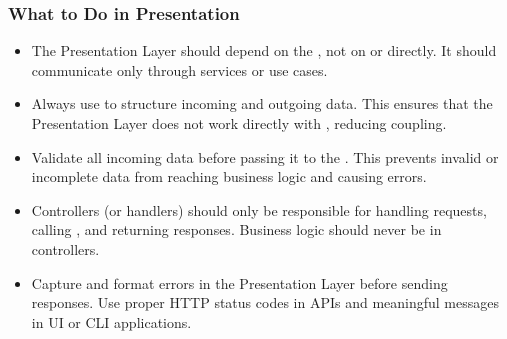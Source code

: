 \documentclass[letterpaper,10pt,english]{sphinxhowto}
\begin{document}
\subsubsection{What to Do in Presentation}
\label{\detokenize{architecture/presentation/index:what-to-do-in-presentation}}\begin{itemize}
\item {} \begin{description}
\sphinxAtStartPar
The Presentation Layer should depend on the , not on  or  directly. It should communicate only through services or use cases.

\end{description}

\item {} \begin{description}
\sphinxAtStartPar
Always use  to structure incoming and outgoing data. This ensures that the Presentation Layer does not work directly with , reducing coupling.

\end{description}

\item {} \begin{description}
\sphinxAtStartPar
Validate all incoming data before passing it to the . This prevents invalid or incomplete data from reaching business logic and causing errors.

\end{description}

\item {} \begin{description}
\sphinxAtStartPar
Controllers (or handlers) should only be responsible for handling requests, calling , and returning responses. Business logic should never be in controllers.

\end{description}

\item {} \begin{description}
\sphinxAtStartPar
Capture and format errors in the Presentation Layer before sending responses. Use proper HTTP status codes in APIs and meaningful messages in UI or CLI applications.


\end{description}
\end{itemize}
\end{document}
